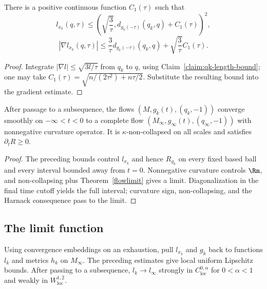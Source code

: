 \begin{corollary}\label{cor:l-function-distance-bound}
\label{lxkest}
There is a positive continuous function $C_1(\tau)$ such that
\[
 l_{x_k}(q,\tau)\leq
 \left(\sqrt{\frac3\tau},d_{g_k(-\tau)}(q_k,q)+C_1(\tau)\right)^2,
\]
\[
 |\nabla l_{x_k}(q,\tau)|\leq
 \frac3\tau d_{g_k(-\tau)}(q_k,q)+
 \sqrt{\frac3\tau}C_1(\tau).
\]
\end{corollary}
\begin{proof}
\sketch
{}
Integrate $|\nabla l|\leq\sqrt{3l/\tau}$ from $q_k$ to $q$, using
Claim~\ref{claim:qk-length-bound}; one may take
$C_1(\tau)=\sqrt{n/(2\tau^2)+n\tau/2}$. Substitute the resulting
bound into the gradient estimate.
\end{proof}

\begin{corollary}\label{cor:kappa-solution-geometric-limit-exists}
After passage to a subsequence, the flows
$(M,g_k(t),(q_k,-1))$ converge smoothly on $-\infty<t<0$ to a
complete flow $(M_\infty,g_\infty(t),(q_\infty,-1))$ with
nonnegative curvature operator. It is $\kappa$-non-collapsed on all
scales and satisfies $\partial_tR\geq0$.
\end{corollary}
\begin{proof}
\sketch The preceding bounds control $l_{x_k}$ and hence $R_{g_k}$
on every fixed based ball and every interval bounded away from
$t=0$. Nonnegative curvature controls $\Rm$, and non-collapsing plus
Theorem~\ref{flowlimit} gives a limit. Diagonalization in the final
time cutoff yields the full interval; curvature sign,
non-collapsing, and the Harnack consequence pass to the limit.
\end{proof}

\subsection{The limit function}

Using convergence embeddings on an exhaustion, pull $l_{x_k}$ and
$g_k$ back to functions $l_k$ and metrics $h_k$ on $M_\infty$.
The preceding estimates give local uniform Lipschitz bounds. After
passing to a subsequence, $l_k\to l_\infty$ strongly in
$C^{0,\alpha}_{\mathrm{loc}}$ for $0<\alpha<1$ and weakly in
$W^{1,2}_{\mathrm{loc}}$.

